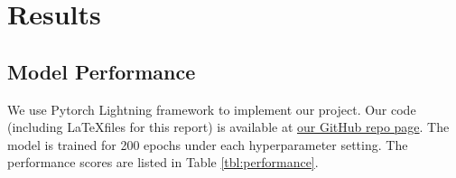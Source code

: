 \documentclass[12pt]{article}
\begin{document}
\section{Results}
\subsection{Model Performance}
We use Pytorch Lightning framework \cite{falcon2019pytorch} to implement our project. Our code (including \LaTeX files for this
report) is available at \href{https://github.com/Freddiechang/CMPUT566}{our GitHub repo page}.
The model is trained for 200 epochs under each hyperparameter setting. The performance scores are listed in Table \ref{tbl:performance}.
\end{document}
